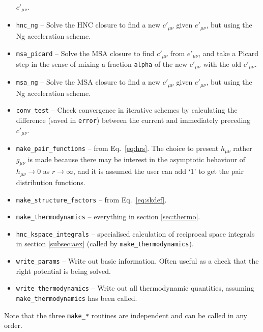 \documentclass[12pt,a4paper]{article}
\newcommand{\Eqref}[1]{Eq.~\eqref{#1}}
\begin{document}
\begin{itemize}
  $c'_{\mu\nu}$.
%
\item\verb+hnc_ng+ -- Solve the HNC closure to find a new
$c'_{\mu\nu}$ given $e'_{\mu\nu}$, but using the Ng acceleration scheme.
%
\item\verb+msa_picard+ -- Solve the MSA closure to find $c'_{\mu\nu}$
  from $e'_{\mu\nu}$, and take a Picard step in the sense of mixing a
  fraction \verb+alpha+ of the new $c'_{\mu\nu}$ with the old
  $c'_{\mu\nu}$.
%
\item\verb+msa_ng+ -- Solve the MSA closure to find a new
$c'_{\mu\nu}$ given $e'_{\mu\nu}$, but using the Ng acceleration scheme.
%
\item\verb+conv_test+ -- Check convergence in iterative schemes by
  calculating the difference (saved in \verb+error+) between the
  current and immediately preceding $c'_{\mu\nu}$.
%
\item\verb+make_pair_functions+ -- from \Eqref{eq:hrs}.  The
  choice to present $h_{\mu\nu}$ rather $g_{\mu\nu}$ is made because
  there may be interest in the asymptotic behaviour of
  $h_{\mu\nu}\to0$ as $r\to\infty$, and it is assumed the user can add
  `1' to get the pair distribution functions.
%
\item\verb+make_structure_factors+ -- from \Eqref{eq:skdef}.
%
\item\verb+make_thermodynamics+ -- everything in section
  \ref{sec:thermo}.
%
\item\verb+hnc_kspace_integrals+ -- specialised calculation of
  reciprocal space integrals in section \ref{subsec:aex} (called
  by \verb+make_thermodynamics+).
%
\item\verb+write_params+ -- Write out basic information.  Often useful
  as a check that the right potential is being solved.
%
\item\verb+write_thermodynamics+ -- Write out all thermodynamic
  quantities, assuming \verb+make_thermodynamics+ has been called.
%
\end{itemize}
%
Note that the three \verb+make_*+ routines are independent and can be
called in any order.
\end{document}
